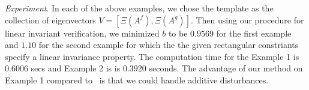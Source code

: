 \emph{Experiment}.  In each of the above examples, we chose the
template as the collection of eigenvectors $V=[\Xi(A^f),\Xi(A^g)]$.
Then using our procedure for linear invariant verification, we
minimized $b$ to be $0.9569$ for the first example and $1.10$ for the
second example for which the the given rectangular constriants specify
a linear invariance property.  The computation time for the Example 1
is $0.6006$ secs and Example 2 is is $0.3920$ seconds.  The advantage of
our method on Example 1
compared to~\cite{allamigeon2015scalable} is that we could handle
additive disturbances.





